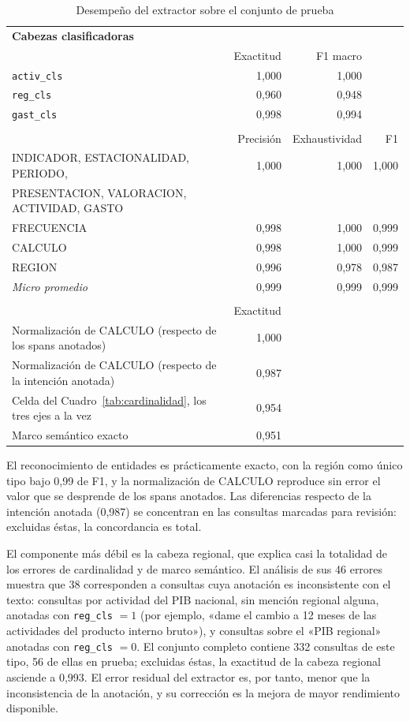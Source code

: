 \documentclass[11pt]{article}
\begin{document}
\begin{table}[htbp]
\centering
\caption{Desempeño del extractor sobre el conjunto de prueba}
\label{tab:resultados}
\small
\begin{tabular}{l rrr}
\toprule
\multicolumn{4}{l}{\textbf{Cabezas clasificadoras}} \\
& Exactitud & F1 macro & \\
\midrule
\texttt{activ\_cls} & 1,000 & 1,000 & \\
\texttt{reg\_cls}   & 0,960 & 0,948 & \\
\texttt{gast\_cls}  & 0,998 & 0,994 & \\
\addlinespace[4pt]
\multicolumn{4}{l}{\textbf{Entidades}} \\
& Precisión & Exhaustividad & F1 \\
\midrule
INDICADOR, ESTACIONALIDAD, PERIODO,  & 1,000 & 1,000 & 1,000 \\
\quad PRESENTACION, VALORACION, ACTIVIDAD, GASTO & & & \\
FRECUENCIA      & 0,998 & 1,000 & 0,999 \\
CALCULO         & 0,998 & 1,000 & 0,999 \\
REGION          & 0,996 & 0,978 & 0,987 \\
\emph{Micro promedio} & 0,999 & 0,999 & 0,999 \\
\addlinespace[4pt]
\multicolumn{4}{l}{\textbf{Medidas compuestas}} \\
& Exactitud & & \\
\midrule
Normalización de CALCULO (respecto de los spans anotados) & 1,000 & & \\
Normalización de CALCULO (respecto de la intención anotada) & 0,987 & & \\
Celda del Cuadro~\ref{tab:cardinalidad}, los tres ejes a la vez & 0,954 & & \\
Marco semántico exacto & 0,951 & & \\
\bottomrule
\end{tabular}
\end{table}

El reconocimiento de entidades es prácticamente exacto, con la región como único
tipo bajo 0,99 de F1, y la normalización de CALCULO reproduce sin error el valor
que se desprende de los spans anotados. Las diferencias respecto de la intención
anotada (0,987) se concentran en las consultas marcadas para revisión: excluidas
éstas, la concordancia es total.

El componente más débil es la cabeza regional, que explica casi la totalidad de
los errores de cardinalidad y de marco semántico. El análisis de sus 46 errores
muestra que 38 corresponden a consultas cuya anotación es inconsistente con el
texto: consultas por actividad del PIB nacional, sin mención regional alguna,
anotadas con \texttt{reg\_cls} $=1$ (por ejemplo, «dame el cambio a 12 meses de
las actividades del producto interno bruto»), y consultas sobre el «PIB
regional» anotadas con \texttt{reg\_cls} $=0$. El conjunto completo contiene 332
consultas de este tipo, 56 de ellas en prueba; excluidas éstas, la exactitud de
la cabeza regional asciende a 0,993. El error residual del extractor es, por
tanto, menor que la inconsistencia de la anotación, y su corrección es la mejora
de mayor rendimiento disponible.
\end{document}
